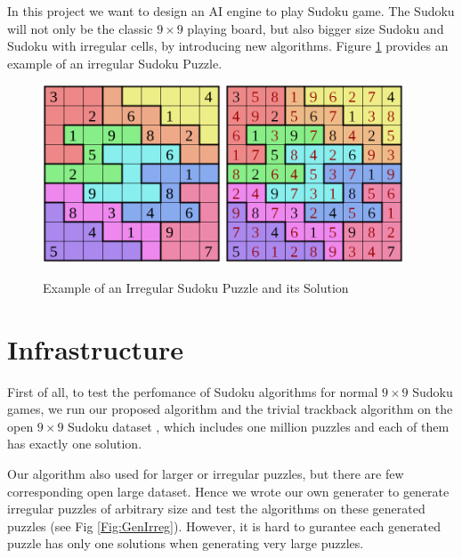\documentclass[12pt]{article}
\begin{document}
\begin{spacing}{1.1}
In this project we want to design an AI engine to play Sudoku game. The Sudoku will not only be the classic $ 9\times9 $ playing board, but also bigger size Sudoku and Sudoku with irregular cells, by introducing new algorithms. Figure \ref{FIg:IrregSudoku} provides an example of an irregular Sudoku Puzzle.
\begin{figure}[h!]
	\centering
	\includegraphics[width=150pt]{pic3.png}
	\hspace{30pt}
	\includegraphics[width=150pt]{pic4.png}
	\caption{Example of an Irregular Sudoku Puzzle and its Solution}
	\label{FIg:IrregSudoku}
\end{figure}

\section{Infrastructure}
First of all, to test the perfomance of Sudoku algorithms for normal $9\times 9$ Sudoku games, we run our proposed algorithm and the trivial trackback algorithm on the open $9\times 9$ Sudoku dataset \cite{kaggle}, which includes one million puzzles and each of them has exactly one solution.

Our algorithm also used for larger or irregular puzzles, but there are few corresponding open large dataset. Hence we wrote our own generater to generate irregular puzzles of arbitrary size and test the algorithms on these generated puzzles (see Fig \ref{Fig:GenIrreg}). However, it is hard to gurantee each generated puzzle has only one solutions when generating very large puzzles.


\end{spacing}
\end{document}
